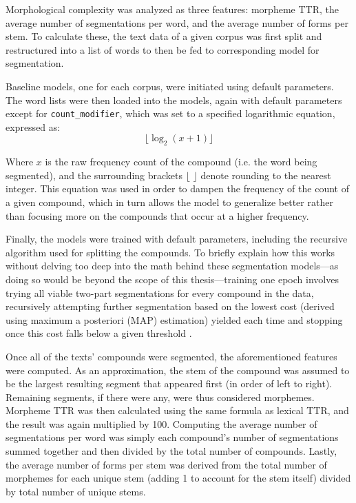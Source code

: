 \documentclass[12pt,a4paper]{article}
\numberwithin{figure}{section}
\numberwithin{table}{section}
\numberwithin{definition}{section}
\begin{document}
Morphological complexity was analyzed as three features: morpheme TTR, the average number of segmentations per word, and the average number of forms per stem. To calculate these, the text data of a given corpus was first split and restructured into a list of words to then be fed to corresponding model for segmentation.

Baseline models, one for each corpus, were initiated using default parameters. The word lists were then loaded into the models, again with default parameters except for \texttt{count\_modifier}, which was set to a specified logarithmic equation, expressed as: \[\lfloor\log_2(x + 1)\rfloor\]

Where \( x \) is the raw frequency count of the compound (i.e. the word being segmented), and the surrounding brackets \( \lfloor \) \( \rfloor \) denote rounding to the nearest integer. This equation was used in order to dampen the frequency of the count of a given compound, which in turn allows the model to generalize better rather than focusing more on the compounds that occur at a higher frequency.

Finally, the models were trained with default parameters, including the recursive algorithm used for splitting the compounds. To briefly explain how this works without delving too deep into the math behind these segmentation models---as doing so would be beyond the scope of this thesis---training one epoch involves trying all viable two-part segmentations for every compound in the data, recursively attempting further segmentation based on the lowest cost (derived using maximum a posteriori (MAP) estimation) yielded each time and stopping once this cost falls below a given threshold \parencite{Smit2014inproceedings}. 




Once all of the texts' compounds were segmented, the aforementioned features were computed. As an approximation, the stem of the compound was assumed to be the largest resulting segment that appeared first (in order of left to right). Remaining segments, if there were any, were thus considered morphemes. Morpheme TTR was then calculated using the same formula as lexical TTR, and the result was again multiplied by 100. Computing the average number of segmentations per word was simply each compound's number of segmentations summed together and then divided by the total number of compounds. Lastly, the average number of forms per stem was derived from the total number of morphemes for each unique stem (adding 1 to account for the stem itself) divided by total number of unique stems.
\end{document}
